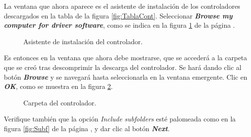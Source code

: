 La ventana que ahora aparece es el asistente de instalación de los controladores descargados en la tabla de la figura \ref{fig:TablaCont}. Seleccionar \textit{\textbf{Browse my computer for driver software}}, como se indica en la figura \ref{fig:Asis} de la página \pageref{fig:Asis}.

\begin{figure}[H] %
\caption[1]{Asistente de instalación del controlador.}
\label{fig:Asis}
\end{figure}

Es entonces en la ventana que ahora debe mostrarse, que se accederá a la carpeta que se creó tras descomprimir la descarga del controlador. Se hará dando clic al botón \textbf{\textit{Browse}} y se navegará hasta seleccionarla en la ventana emergente. Clic en \textit{\textbf{OK}}, como se muestra en la figura \ref{fig:Asis2}.  

\begin{figure}[H] %
\caption[1]{Carpeta del controlador.}
\label{fig:Asis2}
\end{figure}

Verifique también que la opción \textit{Include subfolders} esté palomeada como en la figura \ref{fig:Subf} de la página \pageref{fig:Subf}, y dar clic al botón \textit{\textbf{Next}}. 

